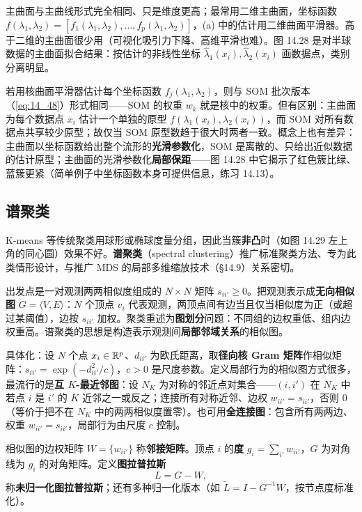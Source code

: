 主曲面与主曲线形式完全相同、只是维度更高；最常用二维主曲面，坐标函数 $f(\lambda_1,\lambda_2)=[f_1(\lambda_1,\lambda_2),\dots,f_p(\lambda_1,\lambda_2)]$，(a) 中的估计用二维曲面平滑器。高于二维的主曲面很少用（可视化吸引力下降、高维平滑也难）。图 14.28 是对半球数据的主曲面拟合结果：按估计的非线性坐标 $\hat\lambda_1(x_i),\hat\lambda_2(x_i)$ 画数据点，类别分离明显。

\begin{remark}
若用核曲面平滑器估计每个坐标函数 $f_j(\lambda_1,\lambda_2)$，则与 SOM 批次版本（\eqref{eq:14_48}）形式相同——SOM 的权重 $w_k$ 就是核中的权重。但有区别：主曲面为每个数据点 $x_i$ 估计一个单独的原型 $f(\lambda_1(x_i),\lambda_2(x_i))$，而 SOM 对所有数据点共享较少原型；故仅当 SOM 原型数趋于很大时两者一致。概念上也有差异：主曲面以坐标函数给出整个流形的\textbf{光滑参数化}，SOM 是离散的、只给出近似数据的估计原型；主曲面的光滑参数化\textbf{局部保距}——图 14.28 中它揭示了红色簇比绿、蓝簇更紧（简单例子中坐标函数本身可提供信息，练习 14.13）。
\end{remark}

\subsection{谱聚类}

K-means 等传统聚类用球形或椭球度量分组，因此当簇\textbf{非凸}时（如图 14.29 左上角的同心圆）效果不好。\textbf{谱聚类}（spectral clustering）推广标准聚类方法、专为此类情形设计，与推广 MDS 的局部多维缩放技术（§14.9）关系密切。

出发点是一对观测两两相似度组成的 $N\times N$ 矩阵 $s_{ii'}\ge 0$。把观测表示成\textbf{无向相似图} $G=\langle V,E\rangle$：$N$ 个顶点 $v_i$ 代表观测，两顶点间有边当且仅当相似度为正（或超过某阈值），边按 $s_{ii'}$ 加权。聚类重述为\textbf{图划分}问题：不同组的边权重低、组内边权重高。谱聚类的思想是构造表示观测间\textbf{局部邻域关系}的相似图。

具体化：设 $N$ 个点 $x_i\in\mathbb{R}^p$、$d_{ii'}$ 为欧氏距离，取\textbf{径向核 Gram 矩阵}作相似矩阵：$s_{ii'}=\exp(-d_{ii'}^2/c)$，$c>0$ 是尺度参数。定义局部行为的相似图方式很多，最流行的是\textbf{互 $K$-最近邻图}：设 $N_K$ 为对称的邻近点对集合——$(i,i')$ 在 $N_K$ 中若点 $i$ 是 $i'$ 的 $K$ 近邻之一或反之；连接所有对称近邻、边权 $w_{ii'}=s_{ii'}$，否则 0（等价于把不在 $N_K$ 中的两两相似度置零）。也可用\textbf{全连接图}：包含所有两两边、权重 $w_{ii'}=s_{ii'}$，局部行为由尺度 $c$ 控制。

相似图的边权矩阵 $W=\{w_{ii'}\}$ 称\textbf{邻接矩阵}。顶点 $i$ 的\textbf{度} $g_i=\sum_{i'}w_{ii'}$，$G$ 为对角线为 $g_i$ 的对角矩阵。定义\textbf{图拉普拉斯}
\begin{equation}
L = G - W, \label{eq:14_63}
\end{equation}
称\textbf{未归一化图拉普拉斯}；还有多种归一化版本（如 $\tilde L=I-G^{-1}W$，按节点度标准化）。

